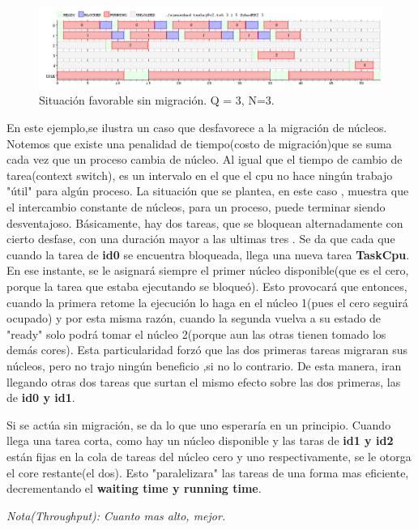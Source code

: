 \documentclass[10pt, a4paper]{article}
\begin{document}
\begin{figure}[H]
  	\centering
   	\includegraphics[width=1\textwidth]
   	 {imgs/8NoMigracion2.png}
	\caption{Situación favorable sin migración. Q = 3, N=3.}
\end{figure}

En este ejemplo,se ilustra un caso que desfavorece a la migración de núcleos. Notemos que existe una penalidad de tiempo(costo de migración)que se suma cada vez que
un proceso cambia de núcleo. Al igual que el tiempo de cambio de tarea(context switch), es un intervalo en el que el cpu no hace ningún trabajo "útil" para algún proceso.
La situación que se plantea, en este caso , muestra que el intercambio constante de núcleos, para un proceso, puede terminar siendo desventajoso.
Básicamente, hay dos tareas, que se bloquean alternadamente con cierto desfase, con una duración mayor a las ultimas tres . Se da que cada que cuando la tarea de \textbf{id0} se encuentra  bloqueada, llega una nueva tarea \textbf{TaskCpu}. En ese instante, se le asignará siempre  el primer núcleo disponible(que es el cero, porque la tarea que estaba ejecutando se bloqueó).
Esto provocará que entonces, cuando la primera retome la ejecución lo haga en el  núcleo 1(pues el cero seguirá ocupado) y por esta misma razón, cuando la segunda vuelva a su estado de  "ready" solo podrá tomar el núcleo 2(porque aun las otras tienen tomado los demás cores). Esta particularidad forzó que las dos primeras tareas migraran sus núcleos, pero no trajo ningún beneficio ,si no lo contrario. De esta manera, iran llegando otras dos tareas que surtan el mismo efecto sobre las dos primeras, las de \textbf{id0 y id1}.

Si se actúa sin migración, se da lo que uno esperaría en un principio. Cuando llega una tarea corta, como hay un núcleo disponible y las taras de \textbf{id1 y id2} están fijas en la cola de tareas del núcleo cero y uno respectivamente, se le otorga el core restante(el dos). Esto "paralelizara" las tareas de una forma mas eficiente, decrementando el \textbf{waiting time y running time}.



\textit{Nota(Throughput): Cuanto mas alto, mejor.}
\end{document}
